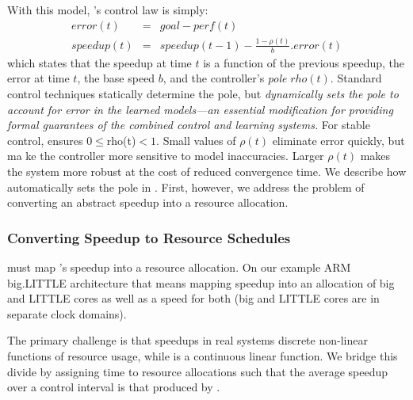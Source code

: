 With this model, \SYSTEM{}'s control law is simply:
\begin{eqnarray}
  error(t) &=& goal - perf(t) \label{eqn:speedup-error} \\
  speedup(t) &=& speedup(t-1) - \frac{1 - \rho(t)}{b}.error(t)
  \label{eqn:speedup-control}
\end{eqnarray}
which states that the speedup at time $t$ is a function of the
previous speedup, the error at time $t$, the base speed $b$, and the
controller's \emph{pole} $rho(t)$.  Standard control techniques
statically determine the pole, but \SYSTEM{} \emph{dynamically sets
  the pole to account for error in the learned models---an essential
  modification for providing formal guarantees of the combined control
  and learning systems.}  For stable control, \SYSTEM{} ensures $ 0
\le $rho(t)$ < 1$. Small values of $\rho(t)$ eliminate error quickly,
but ma ke the controller more sensitive to model inaccuracies.  Larger
$\rho(t)$ makes the system more robust at the cost of reduced
convergence time.  We describe how \SYSTEM{} automatically sets the
pole in .  First, however, we address the problem
of converting an abstract speedup into a resource allocation.

\subsubsection{Converting Speedup to Resource Schedules}
\SYSTEM{} must map 's speedup into a resource
allocation.  On our example ARM big.LITTLE architecture that means
mapping speedup into an allocation of big and LITTLE cores as well as
a speed for both (big and LITTLE cores are in separate clock domains).

The primary challenge is that speedups in real systems discrete
non-linear functions of resource usage, while 
is a continuous linear function.  We bridge this divide by assigning
time to resource allocations such that the average speedup over a
control interval is that produced by .


